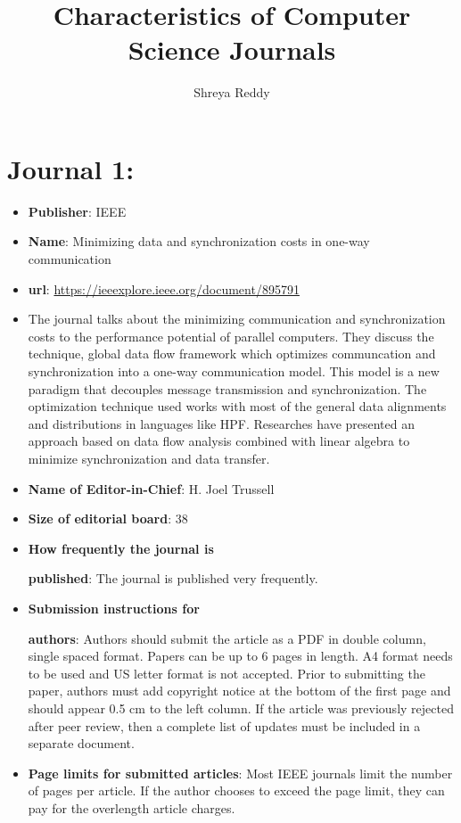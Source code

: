 \documentclass[11pt,twocolumn]{article}
\title{Characteristics of Computer Science Journals}
\author{Shreya Reddy}
\begin{document}
\maketitle

\section{Journal 1:}

\begin{itemize}
   \item {\bf{Publisher}}: IEEE 
    \item {\bf{Name}}: Minimizing data and synchronization costs in one-way communication
     \item {\bf{url}}: \url{https://ieeexplore.ieee.org/document/895791}
      \item  The journal talks about the minimizing communication and synchronization costs to the performance potential of parallel computers. They discuss the technique, global data flow framework which optimizes communcation and synchronization into a one-way communication model. This model is a new paradigm that decouples message transmission and synchronization. The optimization technique used works with most of the general data alignments and distributions in languages like HPF. Researches have presented an approach based on data flow analysis combined with linear algebra to minimize synchronization and data transfer.

       \item {\bf{Name of Editor-in-Chief}}: H. Joel Trussell
        \item {\bf{Size of editorial board}}: 38
	\item {\bf{How frequently the journal is}}       

{\bf{published}}: The journal is published very frequently.
	 \item {\bf{Submission instructions for}}

{\bf{authors}}: Authors should submit the article as a PDF in double column, single spaced format. Papers can be up to 6 pages in length. A4 format needs to be used and US letter format is not accepted. Prior to submitting the paper, authors must add copyright notice at the bottom of the first page and should appear 0.5 cm to the left column. If the article was previously rejected after peer review, then a complete list of updates must be included in a separate document.
	  \item {\bf{Page limits for submitted articles}}: Most IEEE journals limit the number of pages per article. If the author chooses to exceed the page limit, they can pay for the overlength article charges.


\end{itemize}
\end{document}
